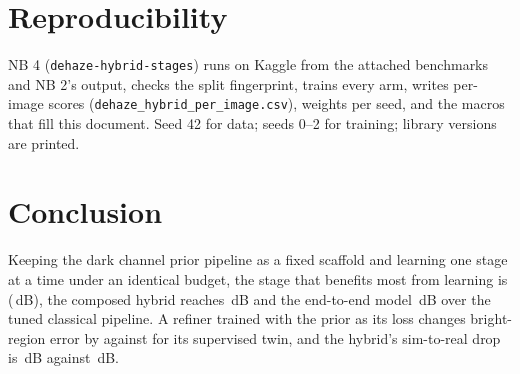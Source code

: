 \documentclass[conference]{IEEEtran}
\begin{document}
\section{Reproducibility}
NB 4 (\texttt{dehaze-hybrid-stages}) runs on Kaggle from the attached benchmarks and NB 2's output, checks the split
fingerprint, trains every arm, writes per-image scores (\texttt{dehaze\_hybrid\_per\_image.csv}), weights per seed, and
the macros that fill this document. Seed 42 for data; seeds 0--2 for training; library versions are printed.

\section{Conclusion}
Keeping the dark channel prior pipeline as a fixed scaffold and learning one stage at a time under an identical budget,
the stage that benefits most from learning is \hybBestStage{} (\hybBestStageGain{}\,dB), the composed hybrid reaches
\hybHAllDelta{}\,dB and the end-to-end model \hybAodDelta{}\,dB over the tuned classical pipeline. A refiner trained
with the prior as its loss changes bright-region error by \hybHTpriorBDelta{} against \hybHTsupBDelta{} for its
supervised twin, and the hybrid's sim-to-real drop is \hybHAllDrop{}\,dB against \hybAodDrop{}\,dB.
\end{document}
